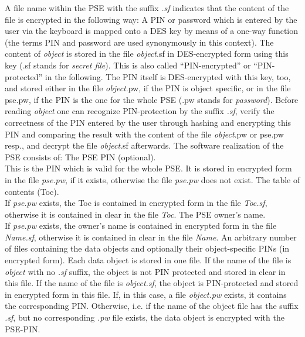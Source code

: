 A file name within the PSE with the suffix {\em .sf} indicates that the
content of the file is encrypted in the following way:
\be
\m A PIN or password which is entered by the user via the keyboard is 
mapped onto a 
   DES key by means of a one-way function (the terms PIN and password are 
used 
   synonymously in this context).
\m The content of {\em object} is stored in the file {\em object}.sf in 
DES-encrypted 
   form using this key (.sf stands for {\em secret file}). This is also 
called ``PIN-encrypted''
   or ``PIN-protected'' in the following.
\m The PIN itself is DES-encrypted with this key, too, and stored either in 
the file {\em object}.pw, 
   if the PIN is object specific, or in the file pse.pw, if the PIN is the 
one for the whole PSE
   (.pw stands for {\em password}).
\m Before reading {\em object} one can recognize PIN-protection by the 
suffix {\em .sf}, verify
   the correctness of the PIN entered by the user through hashing and 
encrypting this PIN and 
   comparing the result with the content of the file {\em object}.pw or 
pse.pw resp., and decrypt the file
   {\em object}.sf afterwards.
\ee
The software realization of the PSE consists of: 
\bi
\m The PSE PIN (optional). \\
   This is the PIN which is valid for the whole PSE. It is stored
   in encrypted form in the file {\em pse.pw}, if it exists, otherwise
   the file {\em pse.pw} does not exist.
\m The table of contents (Toc). \\
   If {\em pse.pw} exists,
   the Toc is contained in encrypted form in the file {\em Toc.sf}, 
   otherwise it is contained in clear in the file {\em Toc}.
\m The PSE owner's name. \\
   If {\em pse.pw} exists,
   the owner's name is contained in encrypted form in the file {\em 
Name.sf}, 
   otherwise it is contained in clear in the file {\em Name}.
\m An arbitrary number of files containing the data objects and optionally 
their 
   object-specific PINs (in encrypted form). 
   Each data object is stored in one file. If the name of the file is {\em 
object} 
   with no {\em .sf} suffix, the object is not PIN protected and stored in 
clear 
   in this file. If the name of the file is {\em object.sf}, the object is 
   PIN-protected and stored in encrypted form in this file.
   If, in this case, a file {\em object.pw} exists, it contains the 
corresponding PIN.
   Otherwise, i.e. if the name of the object
   file has the suffix {\em .sf}, but no corresponding {\em .pw} file 
exists, the data object
   is encrypted with the PSE-PIN. 
